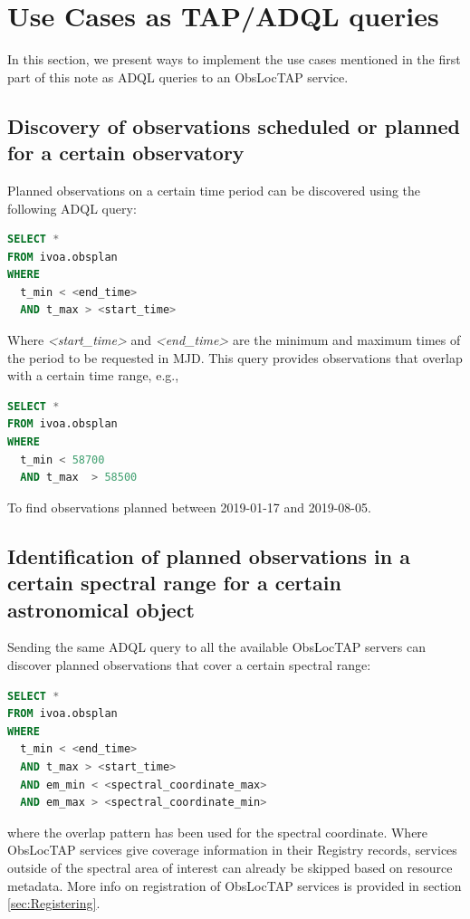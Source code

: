\documentclass[11pt,a4paper]{ivoa}
\begin{document}
\section{Use Cases as TAP/ADQL queries}
In this section, we present ways to implement the use cases mentioned in the
first part of this note as ADQL queries to an ObsLocTAP service.

\subsection{Discovery of observations scheduled or planned for a certain
observatory}
Planned observations on a certain time period can be discovered using the
following ADQL query:

\begin{lstlisting}[language=SQL]
SELECT * 
FROM ivoa.obsplan 
WHERE
  t_min < <end_time>
  AND t_max > <start_time>
\end{lstlisting}
Where \textit{<start\_time>} and \textit{<end\_time> }are the minimum and
maximum times of the period to be requested in MJD. This query provides
observations that overlap with a certain time range, e.g.,

\begin{lstlisting}[language=SQL]
SELECT *
FROM ivoa.obsplan
WHERE
  t_min < 58700
  AND t_max  > 58500
\end{lstlisting}

To find observations planned between 2019-01-17 and 2019-08-05.

\subsection{Identification of planned observations in a certain spectral range
for a certain astronomical object}
Sending the same ADQL query to all the available ObsLocTAP servers can discover
planned observations that cover a certain spectral range:

\begin{lstlisting}[language=SQL]
SELECT *
FROM ivoa.obsplan
WHERE
  t_min < <end_time>
  AND t_max > <start_time>
  AND em_min < <spectral_coordinate_max>
  AND em_max > <spectral_coordinate_min>
\end{lstlisting}
where the overlap pattern has been used for the spectral coordinate.
Where ObsLocTAP services give coverage information in their Registry records,
services outside of the spectral area of interest can already be skipped based
on resource metadata. More info on registration of ObsLocTAP services is provided
in section \ref{sec:Registering}.
\par
\end{document}
